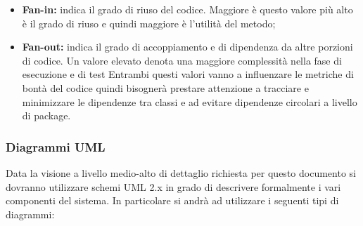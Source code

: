\begin{itemize}
\begin{itemize}
     \item \textbf{Fan-in:} indica il grado di riuso del codice. Maggiore è questo valore più alto è il grado di riuso e quindi maggiore è l’utilità del metodo;
     \item \textbf{Fan-out:} indica il grado di accoppiamento e di dipendenza da altre porzioni di codice. Un valore elevato denota una maggiore complessità nella fase di esecuzione e di test
     Entrambi questi valori vanno a influenzare le metriche di bontà del codice quindi bisognerà prestare attenzione a tracciare e minimizzare le dipendenze tra classi e ad evitare dipendenze circolari a livello di package.
     \end{itemize}
     \end{itemize}
		\subsubsection{Diagrammi UML}
		Data la visione a livello medio-alto di dettaglio richiesta per questo documento si dovranno utilizzare schemi UML 2.x in grado di descrivere formalmente i vari componenti	del sistema.
		In particolare si andrà ad utilizzare i seguenti tipi di diagrammi:
